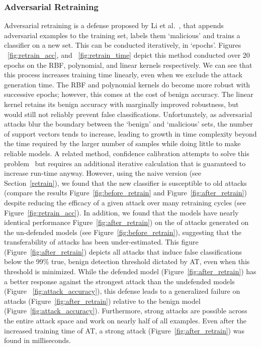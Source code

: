 \documentclass[runningheads]{llncs}
\begin{document}
\subsubsection{Adversarial Retraining}
Adversarial retraining is a defense proposed by  Li et al.~\cite{li2016general}, that appends adversarial examples to the training set, labels them `malicious' and trains a classifier on a new set. This can be conducted iteratively, in `epochs'. Figures ~\ref{fig:retrain_acc}, and ~\ref{fig:retrain_time} depict this method conducted over 20 epochs on the RBF, polynomial, and linear kernels respectively. We can see that this process increases training time linearly, even when we exclude the attack generation time. The RBF and polynomial kernels do become more robust with successive epochs; however, this comes at the cost of benign accuracy. The linear kernel retains its benign accuracy with marginally improved robustness, but would still not reliably prevent false classifications. Unfortunately, as adversarial attacks blur the boundary between the `benign' and `malicious' sets, the number of support vectors tends to increase, leading to growth in time complexity beyond the time required by the larger number of samples while doing little to make reliable models.
A related method, confidence calibration attempts to solve this problem~\cite{croce2020reliable} but requires an additional iterative calculation that is guaranteed to increase run-time anyway. However, using the naive version (see Section~\ref{retrain}), we found that the new classifier is susceptible to old attacks (compare the results Figure~\ref{fig:before_retrain} and Figure~\ref{fig:after_retrain}) despite reducing the efficacy of a given attack over many retraining cycles (see Figure~\ref{fig:retrain_acc}). In addition, we found that the models have nearly identical performance Figure~\ref{fig:after_retrain}) on the of attacks generated on the un-defended models (see Figure~\ref{fig:before_retrain}), suggesting that the transferability of attacks has been under-estimated. This figure (Figure~\ref{fig:after_retrain}) depicts all attacks that induce false classifications below the 99\% true, benign detection threshold dictated by AT, even when this threshold is minimized. While the defended model (Figure~\ref{fig:after_retrain}) has a better response against the strongest attack  than the undefended models (Figure ~\ref{fig:attack_accuracy}), this defense leads to a generalized failure on attacks (Figure~\ref{fig:after_retrain}) relative to the benign model (Figure~\ref{fig:attack_accuracy}). Furthermore, strong attacks are possible across the entire attack space and work on nearly half of all examples. Even after the increased training time of AT, a strong attack  (Figure~\ref{fig:after_retrain}) was found in milliseconds.
\end{document}
